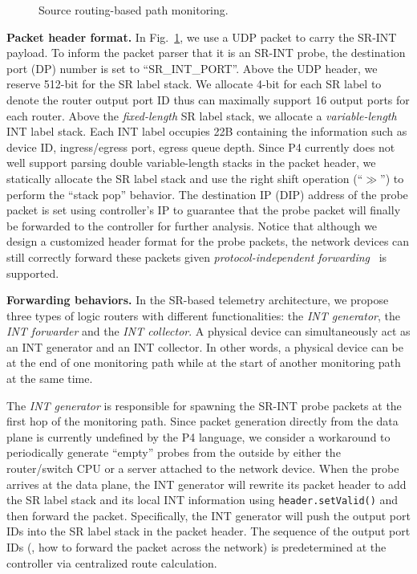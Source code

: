 \begin{figure}
\centering
{}
\vspace{-0.3cm}
\caption{Source routing-based path monitoring.}
\label{fig:demand_int1}
\vspace{-0.3cm}
\end{figure}

\textbf{Packet header format.}
In Fig.~\ref{fig:demand_int1}, we use a UDP packet to carry the SR-INT payload. To inform the packet parser that it is an SR-INT probe, the destination port (DP) number is set to ``SR\_INT\_PORT''. Above the UDP header, we reserve 512-bit for the SR label stack. We allocate 4-bit for each SR label to denote the router output port ID thus can maximally support 16 output ports for each router. Above the \emph{fixed-length} SR label stack, we allocate a \emph{variable-length} INT label stack. Each INT label occupies 22B containing the information such as device ID, ingress/egress port, egress queue depth. Since P4 currently does not well support parsing double variable-length stacks in the packet header, we statically allocate the SR label stack and use the right shift operation (``$\gg$'') to perform the ``stack pop'' behavior. The destination IP (DIP) address of the probe packet is set using controller's IP to guarantee that the probe packet will finally be forwarded to the controller for further analysis. Notice that although we design a customized header format for the probe packets, the network devices can still correctly forward these packets given \emph{protocol-independent forwarding}~\cite{bosshart2014p4} is supported.

\textbf{Forwarding behaviors.}
In the SR-based telemetry architecture, we propose three types of logic routers with different functionalities: the \emph{INT generator}, the \emph{INT forwarder} and the \emph{INT collector}. A physical device can simultaneously act as an INT generator and an INT collector. In other words, a physical device can be at the end of one monitoring path while at the start of another monitoring path at the same time.

The \emph{INT generator} is responsible for spawning the SR-INT probe packets at the first hop of the monitoring path. Since packet generation directly from the data plane is currently undefined by the P4 language, we consider a workaround to periodically generate ``empty'' probes from the outside by either the router/switch CPU or a server attached to the network device. When the probe arrives at the data plane, the INT generator will rewrite its packet header to add the SR label stack and its local INT information using \texttt{header.setValid()} and then forward the packet. Specifically, the INT generator will push the output port IDs into the SR label stack in the packet header. The sequence of the output port IDs (\ie, how to forward the packet across the network) is predetermined at the controller via centralized route calculation. 

